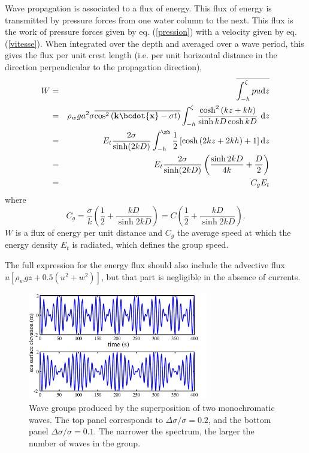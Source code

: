 Wave propagation is associated to a flux of energy. This flux of energy is transmitted by pressure forces
from one water column to the next. This flux is the work 
of pressure forces given by eq. (\ref{pression}) with a velocity given by eq. (\ref{vitesse}). 
When integrated over the depth and averaged over a wave period, this gives the flux per unit crest length (i.e. per unit horizontal 
distance in the direction perpendicular to the propagation direction), 
\begin{eqnarray}
    W & = & \overline{ \int_{-h} ^{\zeta} p u \mathrm{d}z } \nonumber \\
        & = & \rho_w g a^2 \sigma
        \overline{ \cos^2\left({\mathbf k} \bcdot {\mathbf x} - \sigma t \right)  }
        \int_{-h} ^{\zeta} \frac{\cosh^2 \left(kz+kh \right)}{\sinh kD \cosh kD}
        ~ \mathrm{d}z \nonumber \\
        & = & E_t \frac{2  \sigma}{\sinh (2 kD)}
        \int_{-h}^{\zb} \frac{1}{2}\left[\cosh \left(2kz+2kh\right) +1 \right]
        \mathrm{d}z \nonumber \\
        & = & E_t \frac{2  \sigma}{\sinh (2 kD)}
        \left(\frac{\sinh 2kD}{4k}+\frac{D}{2} \right) \nonumber \\
        & = & C_g E_t \label{W}
\end{eqnarray}
where
\begin{equation}
C_g=\frac{\sigma}{k}
        \left(\frac{1}{2}+\frac{kD}{\sinh 2kD}\right)= C \left(\frac{1}{2}+\frac{kD}{\sinh 2kD}\right). \label{Cg}
\end{equation}
$W$ is a flux of energy per unit distance and $C_g$ the average speed at which the energy density $E_t$ is radiated, 
which defines the group speed. 

The full expression for the energy flux should also include the advective flux  $u \left[\rho_w g z + 0.5\left(u^2 +
w^2\right) \right]$, but that part is negligible in the absence of currents. 
\begin{figure}[htb]
\centerline{\includegraphics[width=0.7\textwidth]{FIGS_CH_AIRY/groups_5_10_en.pdf}}
  \caption{Wave groups produced by the superposition of two monochromatic waves. The top panel corresponds to  $\Delta \sigma/\sigma=0.2$, and the bottom panel
 $\Delta \sigma/\sigma=0.1$. The narrower the spectrum, the larger the number of waves in the group.}
\label{groupes}
\end{figure}


